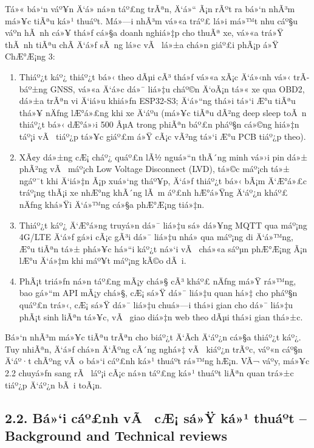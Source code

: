 \documentclass[a4paper]{extarticle}
\providecommand{\tightlist}{%
  \setlength{\itemsep}{0pt}\setlength{\parskip}{0pt}}
\begin{document}
Tá»« bá»‘n váº¥n Ä‘á» ná»n táº£ng trÃªn, Ä‘á»“ Ã¡n rÃºt ra bá»‘n nhÃ³m má»¥c tiÃªu ká»¹ thuáº­t.
Má»—i nhÃ³m vá»«a tráº£ lá»i má»™t nhu cáº§u váº­n hÃ nh cá»¥ thá»ƒ cá»§a doanh nghiá»‡p cho
thuÃª xe, vá»«a trá»Ÿ thÃ nh tiÃªu chÃ­ Ä‘á»ƒ sÃ ng lá»c vÃ  lá»±a chá»n giáº£i phÃ¡p á»Ÿ
ChÆ°Æ¡ng 3:

\begin{enumerate}
\def\labelenumi{\arabic{enumi}.}
\tightlist
\item
  Thiáº¿t káº¿ thiáº¿t bá»‹ theo dÃµi cÃ³ thá»ƒ vá»«a xÃ¡c Ä‘á»‹nh vá»‹ trÃ­ báº±ng GNSS, vá»«a
  Ä‘á»c dá»¯ liá»‡u cháº©n Ä‘oÃ¡n tá»« xe qua OBD2, dá»±a trÃªn vi Ä‘iá»u khiá»ƒn ESP32-S3;
  Ä‘á»“ng thá»i tá»‘i Æ°u tiÃªu thá»¥ nÄƒng lÆ°á»£ng khi xe Ä‘áº­u (má»¥c tiÃªu dÃ²ng deep
  sleep toÃ n thiáº¿t bá»‹ dÆ°á»›i 500 ÂµA trong phiÃªn báº£n pháº§n cá»©ng hiá»‡n táº¡i vÃ 
  tiáº¿p tá»¥c giáº£m á»Ÿ cÃ¡c vÃ²ng tá»‘i Æ°u PCB tiáº¿p theo).
\item
  XÃ¢y dá»±ng cÆ¡ cháº¿ quáº£n lÃ½ nguá»“n thÃ´ng minh vá»›i pin dá»± phÃ²ng vÃ  máº¡ch Low
  Voltage Disconnect (LVD), tá»©c máº¡ch tá»± ngáº¯t khi Ä‘iá»‡n Ã¡p xuá»‘ng tháº¥p, Ä‘á»ƒ
  thiáº¿t bá»‹ bÃ¡m Ä‘Æ°á»£c tráº¡ng thÃ¡i xe nhÆ°ng khÃ´ng lÃ m áº£nh hÆ°á»Ÿng Ä‘áº¿n kháº£ nÄƒng
  khá»Ÿi Ä‘á»™ng cá»§a phÆ°Æ¡ng tiá»‡n.
\item
  Thiáº¿t káº¿ Ä‘Æ°á»ng truyá»n dá»¯ liá»‡u sá»­ dá»¥ng MQTT qua máº¡ng 4G/LTE Ä‘á»ƒ gá»­i cÃ¡c
  gÃ³i dá»¯ liá»‡u nhá» qua máº¡ng di Ä‘á»™ng, Æ°u tiÃªn tá»± phá»¥c há»“i káº¿t ná»‘i vÃ  chá»«a sáºµn
  phÆ°Æ¡ng Ã¡n lÆ°u Ä‘á»‡m khi máº¥t máº¡ng kÃ©o dÃ i.
\item
  PhÃ¡t triá»ƒn ná»n táº£ng mÃ¡y chá»§ cÃ³ kháº£ nÄƒng má»Ÿ rá»™ng, bao gá»“m API mÃ¡y chá»§,
  cÆ¡ sá»Ÿ dá»¯ liá»‡u quan há»‡ cho pháº§n quáº£n trá»‹, cÆ¡ sá»Ÿ dá»¯ liá»‡u chuá»—i thá»i gian
  cho dá»¯ liá»‡u phÃ¡t sinh liÃªn tá»¥c, vÃ  giao diá»‡n web theo dÃµi thá»i gian
  thá»±c.
\end{enumerate}

Bá»‘n nhÃ³m má»¥c tiÃªu trÃªn cho biáº¿t Ä‘Ã­ch Ä‘áº¿n cá»§a thiáº¿t káº¿. Tuy nhiÃªn, Ä‘á»ƒ
chá»n Ä‘Ãºng cÃ´ng nghá»‡ vÃ  kiáº¿n trÃºc, váº«n cáº§n Ä‘áº·t chÃºng vÃ o bá»‘i cáº£nh ká»¹
thuáº­t rá»™ng hÆ¡n. VÃ¬ váº­y, má»¥c 2.2 chuyá»ƒn sang rÃ  láº¡i cÃ¡c ná»n táº£ng ká»¹ thuáº­t
liÃªn quan trá»±c tiáº¿p Ä‘áº¿n bÃ i toÃ¡n.

\subsection{2.2. Bá»‘i cáº£nh vÃ  cÆ¡ sá»Ÿ ká»¹ thuáº­t -- Background and Technical
reviews}\label{22-bux1ed1i-cux1ea3nh-vuxe0-cux1a1-sux1edf-kux1ef9-thuux1eadt--background-and-technical-reviews}
\end{document}
